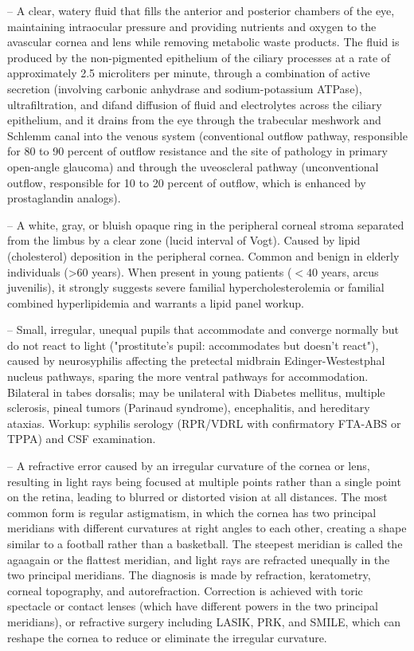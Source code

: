 -- A clear, watery fluid that fills the anterior and posterior chambers of the eye, maintaining intraocular pressure and providing nutrients and oxygen to the avascular cornea and lens while removing metabolic waste products. The fluid is produced by the non-pigmented epithelium of the ciliary processes at a rate of approximately 2.5 microliters per minute, through a combination of active secretion (involving carbonic anhydrase and sodium-potassium ATPase), ultrafiltration, and difand diffusion of fluid and electrolytes across the ciliary epithelium, and it drains from the eye through the trabecular meshwork and Schlemm canal into the venous system (conventional outflow pathway, responsible for 80 to 90 percent of outflow resistance and the site of pathology in primary open-angle glaucoma) and through the uveoscleral pathway (unconventional outflow, responsible for 10 to 20 percent of outflow, which is enhanced by prostaglandin analogs).

-- A white, gray, or bluish opaque ring in the peripheral corneal stroma separated from the limbus by a clear zone (lucid interval of Vogt). Caused by lipid (cholesterol) deposition in the peripheral cornea. Common and benign in elderly individuals (>60 years). When present in young patients ($<40$ years, arcus juvenilis), it strongly suggests severe familial hypercholesterolemia or familial combined hyperlipidemia and warrants a lipid panel workup.

-- Small, irregular, unequal pupils that accommodate and converge normally but do not react to light ("prostitute's pupil: accommodates but doesn't react"), caused by neurosyphilis affecting the pretectal midbrain Edinger-Westestphal nucleus pathways, sparing the more ventral pathways for accommodation. Bilateral in tabes dorsalis; may be unilateral with Diabetes mellitus, multiple sclerosis, pineal tumors (Parinaud syndrome), encephalitis, and hereditary ataxias. Workup: syphilis serology (RPR/VDRL with confirmatory FTA-ABS or TPPA) and CSF examination.

-- A refractive error caused by an irregular curvature of the cornea or lens, resulting in light rays being focused at multiple points rather than a single point on the retina, leading to blurred or distorted vision at all distances. The most common form is regular astigmatism, in which the cornea has two principal meridians with different curvatures at right angles to each other, creating a shape similar to a football rather than a basketball. The steepest meridian is called the agaagain or the flattest meridian, and light rays are refracted unequally in the two principal meridians. The diagnosis is made by refraction, keratometry, corneal topography, and autorefraction. Correction is achieved with toric spectacle or contact lenses (which have different powers in the two principal meridians), or refractive surgery including LASIK, PRK, and SMILE, which can reshape the cornea to reduce or eliminate the irregular curvature.

